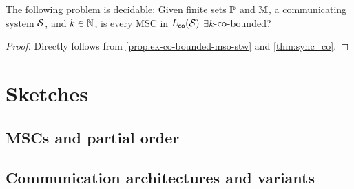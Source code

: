 \documentclass{article}
\begin{document}
\begin{theorem}\label{thm:sync_ek_co_bounded}
	The following problem is decidable: Given finite sets $\mathbb{P}$ and $\mathbb{M}$, a communicating system $\mathcal{S}$, and $k \in \mathbb{N}$, is every MSC in $L_{\mathsf{co}}(\mathcal{S})$ $\exists k$-$\mathsf{co}$-bounded?
\end{theorem}
\begin{proof}
	Directly follows from \ref{prop:ek-co-bounded-mso-stw} and \ref{thm:sync_co}.
\end{proof}

\section{Sketches}

\subsection{MSCs and partial order}



\subsection{Communication architectures and variants}
\end{document}
